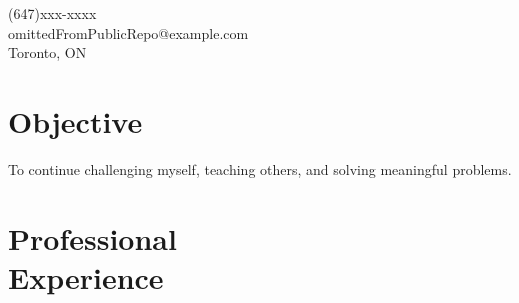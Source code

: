 \documentclass[margin,line]{resume}
\begin{document}
\sffamily %

{
	\sc
    \hfill (647)xxx-xxxx                  \vspace{0mm}\\\vspace{0mm}
    \hfill omittedFromPublicRepo@example.com            \vspace{0mm}\\\vspace{0mm}
    \hfill Toronto, ON                \vspace{0mm}\\\vspace{-10mm}
}

\begin{resume}

\vspace{1mm}

    \section{\mysidestyle \textbf{\large{O}\small{bjective}}}

	\hspace{-3mm}To continue challenging myself, teaching others, and solving meaningful problems.

\sectionline

    \section{\mysidestyle \textbf{\large{P}\small{rofessional\\Experience}}}


\end{resume}
\end{document}
